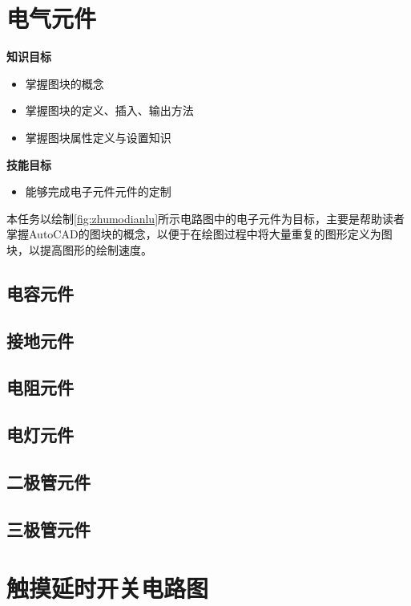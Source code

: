 \section{电气元件}\label{sec:dianqiyuanjian}

{\bfseries 知识目标}
\begin{itemize}
\item 掌握图块的概念
\item 掌握图块的定义、插入、输出方法
\item 掌握图块属性定义与设置知识
\end{itemize}

{\bfseries 技能目标}
\begin{itemize}
\item 能够完成电子元件元件的定制
\end{itemize}

本任务以绘制\ref{fig:zhumodianlu}所示电路图中的电子元件为目标，主要是帮助读者掌握AutoCAD的图块的概念，以便于在绘图过程中将大量重复的图形定义为图块，以提高图形的绘制速度。

\subsection{电容元件}

\subsection{接地元件}

\subsection{电阻元件}

\subsection{电灯元件}

\subsection{二极管元件}

\subsection{三极管元件}

\section{触摸延时开关电路图}

\endinput